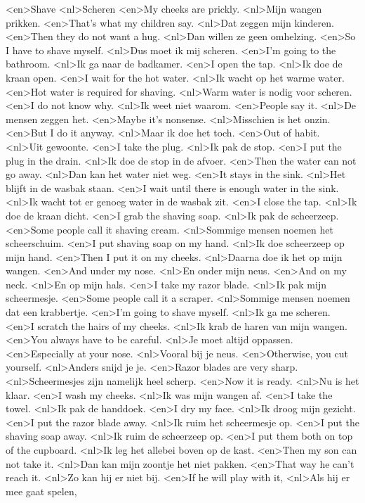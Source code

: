 <en>Shave
<nl>Scheren
<en>My cheeks are prickly.
<nl>Mijn wangen prikken.
<en>That's what my children say.
<nl>Dat zeggen mijn kinderen.
<en>Then they do not want a hug.
<nl>Dan willen ze geen omhelzing.
<en>So I have to shave myself.
<nl>Dus moet ik mij scheren.
<en>I'm going to the bathroom.
<nl>Ik ga naar de badkamer.
<en>I open the tap.
<nl>Ik doe de kraan open.
<en>I wait for the hot water.
<nl>Ik wacht op het warme water.
<en>Hot water is required for shaving.
<nl>Warm water is nodig voor scheren.
<en>I do not know why.
<nl>Ik weet niet waarom.
<en>People say it.
<nl>De mensen zeggen het.
<en>Maybe it's nonsense.
<nl>Misschien is het onzin.
<en>But I do it anyway.
<nl>Maar ik doe het toch.
<en>Out of habit.
<nl>Uit gewoonte.
<en>I take the plug.
<nl>Ik pak de stop.
<en>I put the plug in the drain.
<nl>Ik doe de stop in de afvoer.
<en>Then the water can not go away.
<nl>Dan kan het water niet weg.
<en>It stays in the sink.
<nl>Het blijft in de wasbak staan.
<en>I wait until there is enough water in the sink.
<nl>Ik wacht tot er genoeg water in de wasbak zit.
<en>I close the tap.
<nl>Ik doe de kraan dicht.
<en>I grab the shaving soap.
<nl>Ik pak de scheerzeep.
<en>Some people call it shaving cream.
<nl>Sommige mensen noemen het  scheerschuim.
<en>I put shaving soap on my hand.
<nl>Ik doe scheerzeep op mijn hand.
<en>Then I put it on my cheeks.
<nl>Daarna doe ik het op mijn wangen.
<en>And under my nose.
<nl>En onder mijn neus.
<en>And on my neck.
<nl>En op mijn hals.
<en>I take my razor blade.
<nl>Ik pak mijn scheermesje.
<en>Some people call it a scraper.
<nl>Sommige mensen noemen dat een krabbertje.
<en>I'm going to shave myself.
<nl>Ik ga me scheren.
<en>I scratch the hairs of my cheeks.
<nl>Ik krab de haren van mijn wangen.
<en>You always have to be careful.
<nl>Je moet altijd oppassen.
<en>Especially at your nose.
<nl>Vooral bij je neus.
<en>Otherwise, you cut yourself.
<nl>Anders snijd je je.
<en>Razor blades are very sharp.
<nl>Scheermesjes zijn namelijk heel scherp.
<en>Now it is ready.
<nl>Nu is het klaar.
<en>I wash my cheeks.
<nl>Ik was mijn wangen af.
<en>I take the towel.
<nl>Ik pak de handdoek.
<en>I dry my face.
<nl>Ik droog mijn gezicht.
<en>I put  the razor blade away.
<nl>Ik ruim het scheermesje op.
<en>I put the shaving soap away.
<nl>Ik ruim de scheerzeep op.
<en>I put them both on top of the cupboard.
<nl>Ik leg het allebei boven op de kast.
<en>Then my son can not take it.
<nl>Dan kan mijn zoontje het niet pakken.
<en>That way he can't reach it.
<nl>Zo kan hij er niet bij.
<en>If he will play with it,
<nl>Als hij er mee gaat spelen,
